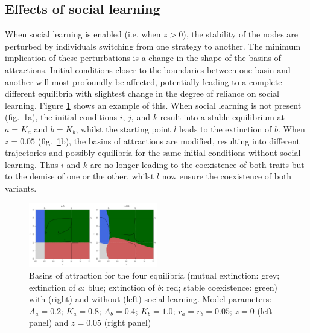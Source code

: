\documentclass[3p,authoryear,twocolumn]{elsarticle} %
\begin{document}
\subsection{Effects of social learning}

When social learning is enabled (i.e. when $z>0$), the stability of the nodes are perturbed by individuals switching from one strategy to another. The minimum implication of these perturbations is a change in the shape of the basins of attractions. Initial conditions closer to the boundaries between one basin and another will most profoundly be affected, potentially leading to a complete different equilibria with slightest change in the degree of reliance on social learning. Figure \ref{fig:TransmissionBasin} shows an example of this. When social learning is not present (fig.~\ref{fig:TransmissionBasin}a), the initial conditions $i$, $j$, and $k$ result into a stable equilibrium at $a=K_a$ and $b=K_b$, whilst the starting point $l$ leads to the extinction of $b$. When $z=0.05$ (fig.~\ref{fig:TransmissionBasin}b), the basins of attractions are modified, resulting into different trajectories and possibly equilibria for the same initial conditions without social learning. Thus $i$ and $k$ are no longer leading to the coexistence of both traits but to the demise of one or the other, whilst $l$ now ensure the coexistence of both variants. 

\begin{figure}[h!]
  \centering
      \includegraphics[width=0.5\textwidth]{./figures/figure3.pdf}
  \caption{Basins of attraction for the four equilibria (mutual extinction: grey; extinction of $a$: blue; extinction of $b$: red; stable coexistence: green) with (right) and without (left) social learning. Model parameters: $A_a=0.2$; $K_a=0.8$; $A_b=0.4$; $K_b=1.0$; $r_a=r_b=0.05$; $z=0$ (left panel) and $z=0.05$ (right panel) }
    \label{fig:TransmissionBasin}
\end{figure}
\end{document}
